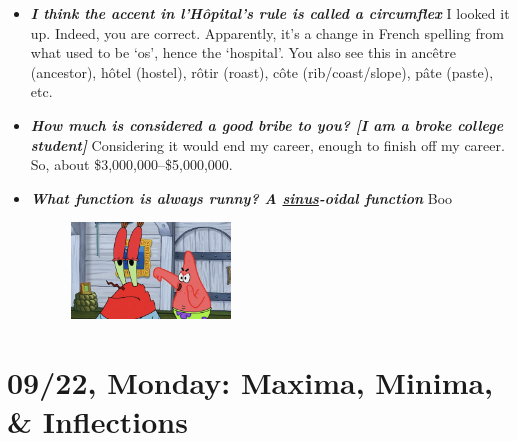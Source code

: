 \documentclass[11pt,letterpaper]{article}
\begin{document}
\begin{itemize}
\item {\bfseries\itshape I think the accent in l'H\^{o}pital's rule is called a circumflex} I looked it up. Indeed, you are correct. Apparently, it's a change in French spelling from what used to be `os', hence the `hospital'. You also see this in anc\^etre (ancestor), h\^otel (hostel), r\^otir (roast), c\^ote (rib/coast/slope), p\^ate (paste), etc.

\item {\bfseries\itshape How much is considered a good bribe to you? [I am a broke college student]} Considering it would end my career, enough to finish off my career. So, about \$3,000,000--\$5,000,000.

\item {\bfseries\itshape What function is always runny? A \underline{sinus}-oidal function} Boo
	\begin{figure}[H]
	\centering
	\includegraphics[width=0.4\textwidth]{images/boo.png}
	\end{figure}
\end{itemize}

\newpage
\section*{09/22, Monday: Maxima, Minima, \& Inflections\label{09-22}}
\end{document}
